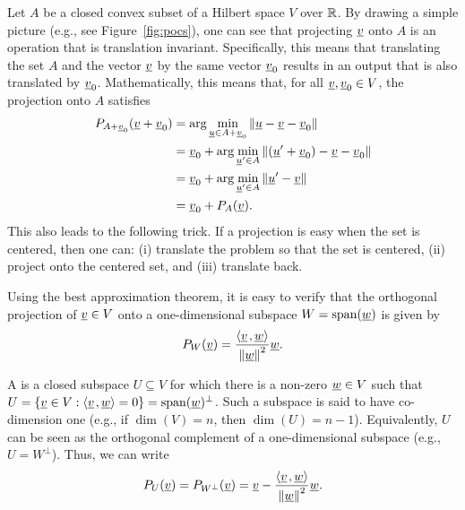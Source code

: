 Let $A$ be a closed convex subset of a Hilbert space $V$ over $\mathbb{R}$.
By drawing a simple picture (e.g., see Figure~\ref{fig:pocs}), one can see that projecting $\underline{v}$ onto $A$ is an operation that is translation invariant.
Specifically, this means that translating the set $A$ and the vector $\underline v$ by the same vector $\underline v_{0}$ results in an output that is also translated by $\underline v_{0}$.
Mathematically, this means that, for all $\underline v,\underline v_{0}\in V$, the projection onto $A$ satisfies
\begin{align*}
P_{A+\underline v_{0}}(\underline v+\underline v_{0}) & =\arg\min_{\underline u\in A+\underline v_{0}}\left\Vert \underline u-\underline v-\underline v_{0}\right\Vert \nonumber \\
 & =\underline v_{0}+\arg\min_{\underline u'\in A}\left\Vert (\underline u'+\underline v_{0})-\underline v-\underline v_{0}\right\Vert \nonumber \\
 & =\underline v_{0}+\arg\min_{\underline u'\in A}\left\Vert \underline u'-\underline v\right\Vert \nonumber \\
 & =\underline v_{0}+P_{A}(\underline v).\label{eq:proj_trans}
\end{align*}
This also leads to the following trick. If a projection is easy when the set is centered, then one can: (i) translate the problem so that the set is centered, (ii) project onto the centered set, and (iii) translate back. 

Using the best approximation theorem, it is easy to verify that the orthogonal projection of $\underline v\in V$ onto a one-dimensional subspace $W=\text{span}(\underline w)$ is given by
\[
P_{W}(\underline v)=\frac{{\left\langle  \underline v \mskip2mu , \underline w \right\rangle} }{\left\Vert \underline w\right\Vert ^{2}}\underline w.
\]

A  is a closed subspace $U\subseteq V$ for which there is a non-zero $\underline{w}\in V$ such that $U=\{\underline{v}\in V:{\left\langle \underline{v} \mskip2mu , \underline{w} \right\rangle}=0\}=\mathrm{span}(\underline{w})^{\bot}$.
Such a subspace is said to have co-dimension one (e.g., if $\dim(V)=n$, then $\dim(U) = n-1$). Equivalently, $U$ can be seen as the orthogonal complement of a one-dimensional subspace (e.g., $U=W^{\perp}$).
Thus, we can write
\[
P_{U}(\underline v)=P_{W^{\perp}}(\underline v)=\underline v-\frac{{\left\langle  \underline v \mskip2mu , \underline w \right\rangle} }{\left\Vert \underline w\right\Vert ^{2}}\underline w.
\]

